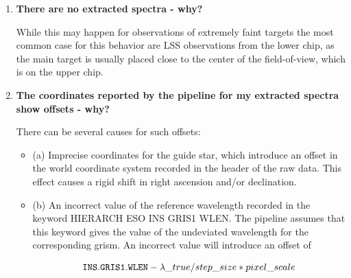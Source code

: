 \begin{enumerate}
Unfortunately the spectral energy distribution of the flat field lamp use for GRIS\_1200B data can vary considerably on short timescales. In such cases the FLAT\_SED\_<mode> used to correct the effect of
the position-dependent response will differ even if they were taken at the same position on the CCD.

So it will be impossible to correct the effect. If you have LSS data it is very likely that the flux standard star was observed at the same position on the CCD as your science target, so that you may use {\tt use\_flat\_sed=}false. In the case of MOS/MXU data there is unfortunately no solution for this problem. With {\tt use\_flat\_sed=}true you can correct the small scale variations of the detector response at the price of introducing spurious flux variations. Setting {\tt use\_flat\_sed=}false, however, will not correct for the position dependency of the response, which can severely distort the SED of your targets, up to reversing the slope of the spectra (i.e. making a hot spectrum look cool and vice versa).

\item {\bf There are no extracted spectra - why?}

While this may happen for observations of extremely faint targets the most common case for this behavior are LSS observations from the lower chip, as the main target is usually placed close to the center of the field-of-view, which is on the upper chip.

\item {\bf The coordinates reported by the pipeline for my extracted spectra show offsets - why?}

There can be several causes for such offsets:

\begin{itemize}
\item (a) Imprecise coordinates for the guide star, which introduce an offset in the world coordinate system recorded in the header of the raw data. This effect causes a rigid shift in right ascension and/or declination.

\item (b) An incorrect value of the reference wavelength recorded in the keyword HIERARCH ESO INS GRIS1 WLEN. The pipeline assumes that this keyword gives the value of the undeviated wavelength for the corresponding grism. An incorrect value will introduce an offset of

\begin{equation}
{{{\tt INS.GRIS1.WLEN} - \lambda \_{true}}/ step\_size} * pixel\_scale
\end{equation}


\end{itemize}
\end{enumerate}
